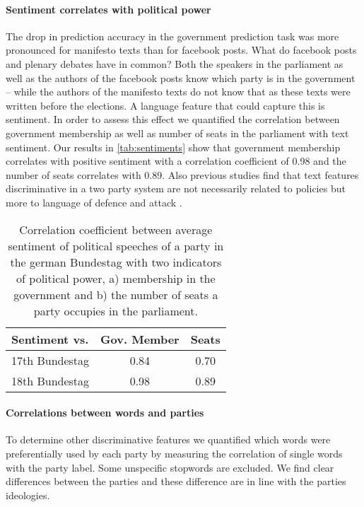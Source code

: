 \documentclass[11pt]{article}
\begin{document}
\paragraph{Sentiment correlates with political power}
The drop in prediction accuracy in the government prediction task was more pronounced for manifesto texts than for facebook posts. What do facebook posts and plenary debates have in common? Both the speakers in the parliament as well as the authors of the facebook posts know which party is in the government -- while the authors of the manifesto texts do not know that as these texts were written before the elections. A language feature that could capture this is sentiment. 
In order to assess this effect we quantified the correlation between government membership as well as number of seats in the parliament with text sentiment. Our results in  \autoref{tab:sentiments} show that government membership correlates with positive sentiment with a correlation coefficient of 0.98 and the number of seats correlates with 0.89. Also previous studies find that text features discriminative in a two party system are not necessarily related to policies but more to language of defence and attack \cite{Hirst2014}. 

\begin{table}[t]
\caption{
\label{tab:sentiments}
Correlation coefficient between average sentiment of political speeches of a party in the german Bundestag with two indicators of political power, a) membership in the government and b) the number of seats a party occupies in the parliament.
}
\begin{center}
\begin{tabular}{lcc}
   Sentiment vs. &          Gov. Member    &  Seats\\
\hline\hline
17th Bundestag    &  0.84 & 0.70\\
18th Bundestag   &  0.98 & 0.89\\
%
\end{tabular}
\end{center}
\end{table}


%
\paragraph{Correlations between words and parties}
To determine other discriminative features we quantified which words were preferentially used by each party by measuring the correlation of single words with the party label. Some unspecific stopwords are excluded. We find clear differences between the parties and these difference are in line with the parties ideologies. 
\end{document}
